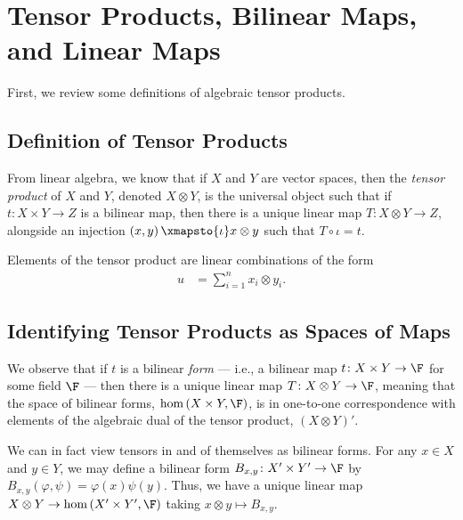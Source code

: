 \documentclass[10pt]{mypackage}
\begin{document}
\RaggedRight
\section{Tensor Products, Bilinear Maps, and Linear Maps}%
First, we review some definitions of algebraic tensor products.
\subsection{Definition of Tensor Products}%
From linear algebra, we know that if $X$ and $Y$ are vector spaces, then the \textit{tensor product} of $X$ and $Y$, denoted $X\otimes Y$, is the universal object such that if $t\colon X\times Y\rightarrow Z$ is a bilinear map, then there is a unique linear map $T\colon X\otimes Y\rightarrow Z$, alongside an injection $\left( x,y \right)\xmapsto{\iota} x\otimes y$ such that $T\circ\iota = t$.
\begin{center}
\end{center}
Elements of the tensor product are linear combinations of the form
\begin{align*}
  u &= \sum_{i=1}^{n} x_i\otimes y_i.
\end{align*}
\subsection{Identifying Tensor Products as Spaces of Maps}%
We observe that if $t$ is a bilinear \textit{form} --- i.e., a bilinear map $t\colon X\times Y\rightarrow \F$ for some field $\F$ --- then there is a unique linear map $T\colon X\otimes Y\rightarrow \F$, meaning that the space of bilinear forms, $\hom\left( X\times Y,\F \right)$, is in one-to-one correspondence with elements of the algebraic dual of the tensor product, $\left( X\otimes Y \right)'$.

We can in fact view tensors in and of themselves as bilinear forms. For any $x\in X$ and $y\in Y$, we may define a bilinear form $B_{x,y}\colon X'\times Y'\rightarrow \F$ by $B_{x,y}(\varphi,\psi) = \varphi(x)\psi(y)$. Thus, we have a unique linear map $X\otimes Y\rightarrow \hom\left( X'\times Y',\F \right)$ taking $x\otimes y \mapsto B_{x,y}$.
\end{document}
